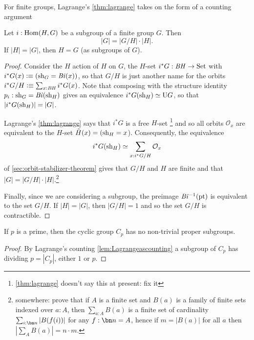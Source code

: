 For finite groups, Lagrange's \cref{thm:lagrange} takes on the form of a counting argument
\begin{lemma}
  \label{lem:Lagrangeascounting}
  Let $i:\Hom(H,G)$ be a subgroup of a finite group $G$.  Then 
$$|G|=|G/H|\cdot|H|.$$
If $|H|=|G|$, then $H=G$ (as subgroups of $G$).
\end{lemma}
\begin{proof}
  Consider the $H$ action of $H$ on $G$, \ie the $H$-set $i^*G:\mathit{B}\mathit{H}\to\mathrm{Set}$ with $i^*G(x)\defequi(\sh_G=\Bi(x))$, so that $G/H$ is just another name for the orbits $i^*G/H\defequi \sum_{x:\BH}i^*G(x)$.  Note that composing with the structure identity $p_i:\mathrm{sh}_G=\mathit{B}\mathit{i}(\mathrm{sh}_H)$ gives an equivalence $i^*G(\mathrm{sh}_H)\simeq \mathrm{U} G$, so that $|i^*G(\mathrm{sh}_H)|= |G|$.

  Lagrange's \cref{thm:lagrange} says that $i^*G$ is a free $H$-set \footnote{\cref{thm:lagrange} doesn't say this at present: fix it} and so all orbits $\mathcal O_x$ are equivalent to the $H$-set $\tilde H(x)=(\mathrm{sh}_H=x$).
Consequently, the equivalence 
$$i^*G(\mathrm{sh}_H)\simeq\sum_{x:i^*G/H}\mathcal O_x$$ 
of \cref{sec:orbit-stabilizer-theorem} gives that $G/H$ and $H$ are finite and that $|G|=|G/H|\cdot|H|$.\footnote{somewhere: prove that if $A$ is a finite set and $B(a)$ is a family of finite sets indexed over $a:A$, then $\sum_{a:A}B(a)$ is a finite set of cardinality $\sum_{i:\bn n}|B(f(i))|$ for any $f:\bn n=A$, hence if $m=|B(a)|$ for all $a$ then $|\sum_AB(a)|=n\cdot m$.}


Finally, since we are considering a subgroup, the preimage $\mathit{B}\mathit{i}^{-1}(\mathrm{pt})$ is equivalent to the set $G/H$.  If $|H|=|G|$, then $|G/H|=1$ and so the set $G/H$ is contractible.\end{proof}


    \begin{corollary}
      \label{cor:cyclicgroupsaresimple}
      If $p$ is a prime, then  the cyclic group $C_p$ has no non-trivial proper subgroups.
    \end{corollary}
    \begin{proof}
      By Lagrange's counting \cref{lem:Lagrangeascounting} a subgroup of $C_p$ has \gporder dividing $p=|C_p|$, \ie either $1$ or $p$.
    \end{proof}

